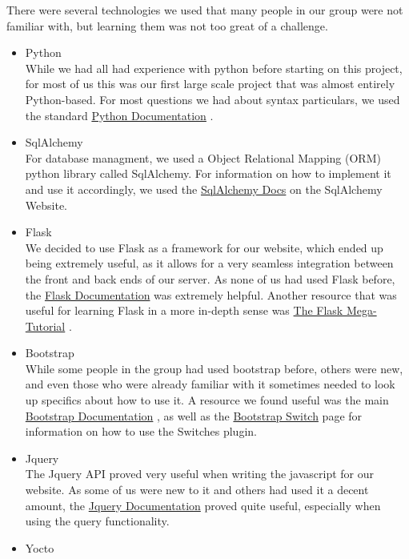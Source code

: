 There were several technologies we used that many people in our group were not familiar with, but learning them was not too great of a challenge.

\begin{itemize}
	\item Python \\
	While we had all had experience with python before starting on this project, for most of us this was our first large scale project that was almost entirely Python-based. For most questions we had about syntax particulars, we used the standard \href{https://docs.python.org/}{Python Documentation} \cite{python}.
	\item SqlAlchemy \\
	For database managment, we used a Object Relational Mapping (ORM) python library called SqlAlchemy. For information on how to implement it and use it accordingly, we used the \href{http://docs.sqlalchemy.org/}{SqlAlchemy Docs} \cite{sqlalchemy} on the SqlAlchemy Website.
	\item Flask \\
	We decided to use Flask as a framework for our website, which ended up being extremely useful, as it allows for a very seamless integration between the front and back ends of our server. As none of us had used Flask before, the \href{http://flask.pocoo.org/docs/}{Flask Documentation} \cite{flask} was extremely helpful. Another resource that was useful for learning Flask in a more in-depth sense was \href{http://blog.miguelgrinberg.com/post/the-flask-mega-tutorial-part-i-hello-world/}{The Flask Mega-Tutorial} \cite{flaskmega}.
	\item Bootstrap \\
	While some people in the group had used bootstrap before, others were new, and even those who were already familiar with it sometimes needed to look up specifics about how to use it. A resource we found useful was the main \href{http://getbootstrap.com/}{Bootstrap Documentation} \cite{bootstrap}, as well as the \href{http://bootstrap-switch.org/}{Bootstrap Switch} \cite{bootstrapswitch} page for information on how to use the Switches plugin.
	\item Jquery \\
	The Jquery API proved very useful when writing the javascript for our website. As some of us were new to it and others had used it a decent amount, the \href{http://api.jquery.com/}{Jquery Documentation} \cite{jquery} proved quite useful, especially when using the query functionality.
	\item Yocto \\

\end{itemize}
